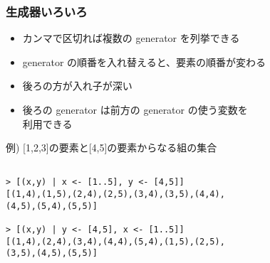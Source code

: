 \documentclass[dvipdfmx,cjk,xcolor=dvipsnames,envcountsect,notheorems,12pt]{beamer}
\theoremstyle{definition}
\begin{document}

\begin{frame}[fragile]
\frametitle{生成器いろいろ}
\begin{itemize}
\item カンマで区切れば複数の generator を列挙できる
\item generator の順番を入れ替えると、要素の順番が変わる
\item 後ろの方が入れ子が深い
\item 後ろの generator は前方の generator の使う変数を \\ 利用できる
\end{itemize}
\begin{exampleblock}{例) [1,2,3]の要素と[4,5]の要素からなる組の集合}
\begin{lstlisting}[frame=none]　
> [(x,y) | x <- [1..5], y <- [4,5]] 
[(1,4),(1,5),(2,4),(2,5),(3,4),(3,5),(4,4),
(4,5),(5,4),(5,5)]

> [(x,y) | y <- [4,5], x <- [1..5]] 
[(1,4),(2,4),(3,4),(4,4),(5,4),(1,5),(2,5),
(3,5),(4,5),(5,5)]
\end{lstlisting}
\vfill
\end{exampleblock}
\vfill
\end{frame}
\end{document}

